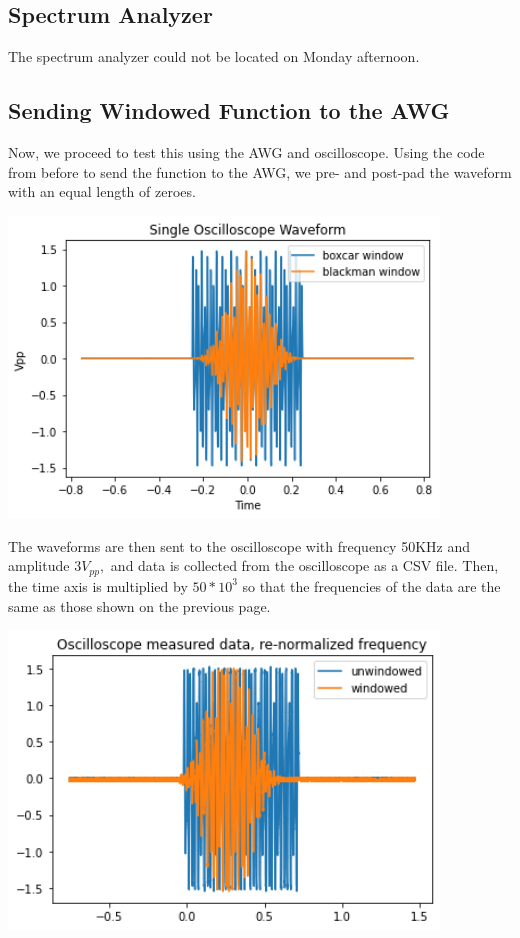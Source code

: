 \documentclass{article}
\begin{document}
    \subsection*{Spectrum Analyzer}
    The spectrum analyzer could not be located on Monday afternoon.
    \subsection*{Sending Windowed Function to the AWG}
    Now, we proceed to test this using the AWG and oscilloscope. Using the code from before to send the function to the AWG, we pre- and post-pad the waveform with an equal length of zeroes.
    \begin{mdframed}[backgroundcolor=gray!20, align = center, userdefinedwidth = 4.8in]
    \includegraphics[width = 4.5in]{img/oscilloscope waveform.png}
    \end{mdframed}
    The waveforms are then sent to the oscilloscope with frequency 50KHz and amplitude $3V_{pp},$ and data is collected from the oscilloscope as a CSV file. Then, the time axis is multiplied by $50*10^3$ so that the frequencies of the data are the same as those shown on the previous page.
    \begin{mdframed}[backgroundcolor=gray!20, align = center, userdefinedwidth = 4.8in]
    \includegraphics[width = 4.5in]{img/oscilloscopeOut.png}
    \end{mdframed}
\end{document}
